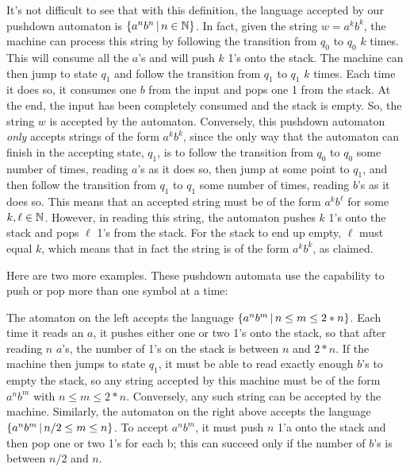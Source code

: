 It's not difficult to see that with this definition, the language
accepted by our pushdown automaton is $\{a^nb^n\,|\, n\in{\mathbb N}\}$.
In fact, given the string $w=a^kb^k$, the machine can process this
string by following the transition from $q_0$ to $q_0$ $k$ times.
This will consume all the $a$'s and will push $k$ 1's onto the stack.
The machine can then jump to state $q_1$ and follow the transition from
$q_1$ to $q_1$ $k$ times.  Each time it does so, it consumes one $b$ from
the input and pops one 1 from the stack.  At the end, the input has been
completely consumed and the stack is empty.  So, the string $w$ is
accepted by the automaton.  Conversely, this pushdown automaton \emph{only}
accepts strings of the form $a^kb^k$, since the only way that the
automaton can finish in the accepting state, $q_1$, is to follow
the transition from $q_0$ to $q_0$ some number of times, reading
$a$'s as it does so, then jump at some point to $q_1$, and then
follow the transition from $q_1$ to $q_1$ some number of times,
reading $b$'s as it does so.  This means that an accepted string
must be of the form $a^kb^\ell$ for some $k,\ell\in{\mathbb N}$.  However, in
reading this string, the automaton pushes $k$ 1's onto the stack
and pops $\ell$ 1's from the stack.  For the stack to end up empty,
$\ell$ must equal $k$, which means that in fact the string is of
the form $a^kb^k$, as claimed.  

\medbreak

Here are two more examples.  These pushdown automata use the capability
to push or pop more than one symbol at a time:

\medskip
\centerline{}
\smallskip

\noindent The atomaton on the left accepts the language
$\{a^nb^m\,|\, n\le m\le 2*n\}$.  Each time it reads an $a$,
it pushes either one or two 1's onto the stack, so that
after reading $n$ $a$'s, the number of 1's on the stack
is between $n$ and $2*n$.  If the machine then jumps to state
$q_1$, it must be able to read exactly enough $b$'s to empty 
the stack, so any string accepted by this machine must
be of the form $a^nb^m$ with $n\le m\le 2*n$.  Conversely,
any such string can be accepted by the machine. Similarly,
the automaton on the right above accepts the
language $\{a^nb^m\,|\, n/2 \le m \le n\}$.
To accept $a^nb^m$, it must push $n$ 1'a onto the
stack and then pop one or two 1's for each b; this
can succeed only if the number of $b$'s is between
$n/2$ and $n$.



